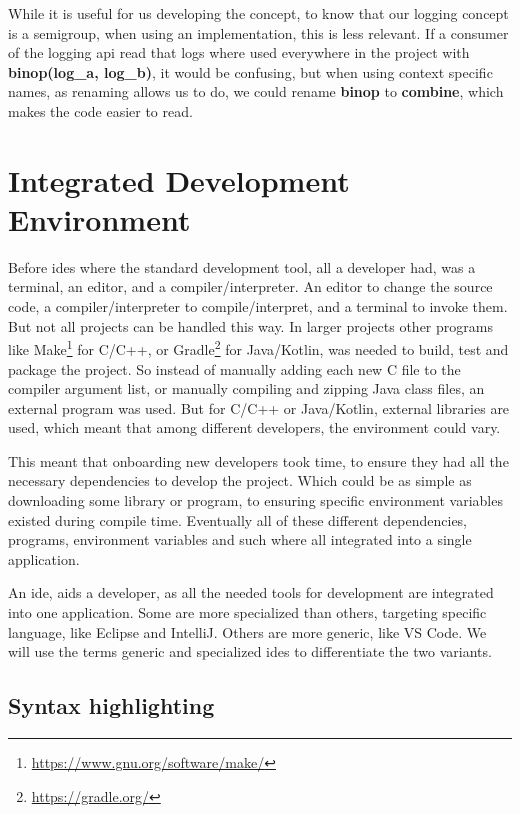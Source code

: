 While it is useful for us developing the concept, to know that our logging
concept is a semigroup, when using an implementation, this is less relevant.
If a consumer of the logging \gls*{api} read that logs where used everywhere in
the project with \textbf{binop(log\_a, log\_b)}, it would be confusing, but when
using context specific names, as renaming allows us to do, we could rename
\textbf{binop} to \textbf{combine}, which makes the code easier to read.


\section{Integrated Development Environment} \label{sec:ide}

Before \gls*{ide}s where the standard development tool, all a developer had, was
a terminal, an editor, and a compiler/interpreter. An editor to change the
source code, a compiler/interpreter to compile/interpret, and a terminal to
invoke them. But not all projects can be handled this way. In larger projects
other programs like
Make\footnote{\url{https://www.gnu.org/software/make/}} for C/C++, or
Gradle\footnote{\url{https://gradle.org/}} for Java/Kotlin, was needed to
build, test and package the project. So instead of manually adding each new C
file to the compiler argument list, or manually compiling and zipping Java class
files, an external program was used. But for C/C++ or Java/Kotlin, external
libraries are used, which meant that among different developers, the environment
could vary.

This meant that onboarding new developers took time, to ensure they had all the
necessary dependencies to develop the project. Which could be as simple as
downloading some library or program, to ensuring specific environment variables
existed during compile time. Eventually all of these different dependencies,
programs, environment variables and such where all integrated into a single
application.

An \gls*{ide}, aids a developer, as all the needed tools for development are
integrated into one application. Some are more specialized than others,
targeting specific language, like Eclipse and IntelliJ. Others are
more generic, like VS Code. We will use the terms generic and specialized
\gls*{ide}s to differentiate the two variants.


\subsection{Syntax highlighting}

